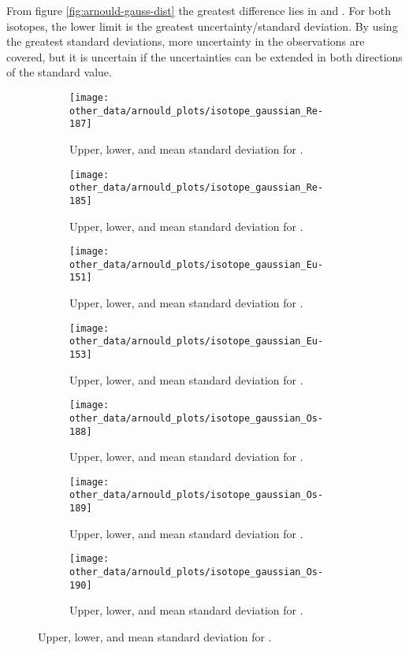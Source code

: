 From figure \ref{fig:arnould-gauss-dist} the greatest difference lies in  and . For both isotopes, the lower limit is the greatest uncertainty/standard deviation. By using the greatest standard deviations, more uncertainty in the observations are covered, but it is uncertain if the uncertainties can be extended in both directions of the standard value.
\newlength{\subfiglength}
\setlength{\subfiglength}{0.24\textwidth}

\begin{figure}
  \begin{subfigure}{\subfiglength}
    \centering
    \texttt{[image: other\_data/arnould\_plots/isotope\_gaussian\_Re-187]}
    \caption{Upper, lower, and mean standard deviation for .}
  \end{subfigure}
  \begin{subfigure}{\subfiglength}
    \centering
    \texttt{[image: other\_data/arnould\_plots/isotope\_gaussian\_Re-185]}
    \caption{Upper, lower, and mean standard deviation for .}
  \end{subfigure}
  \begin{subfigure}{\subfiglength}
    \centering
    \texttt{[image: other\_data/arnould\_plots/isotope\_gaussian\_Eu-151]}
    \caption{Upper, lower, and mean standard deviation for .}
  \end{subfigure}
  \begin{subfigure}{\subfiglength}
    \centering
    \texttt{[image: other\_data/arnould\_plots/isotope\_gaussian\_Eu-153]}
    \caption{Upper, lower, and mean standard deviation for .}
  \end{subfigure}
  \begin{subfigure}{\subfiglength}
    \centering
    \texttt{[image: other\_data/arnould\_plots/isotope\_gaussian\_Os-188]}
    \caption{Upper, lower, and mean standard deviation for .}
  \end{subfigure}
  \begin{subfigure}{\subfiglength}
    \centering
    \texttt{[image: other\_data/arnould\_plots/isotope\_gaussian\_Os-189]}
    \caption{Upper, lower, and mean standard deviation for .}
  \end{subfigure}
  \begin{subfigure}{\subfiglength}
    \centering
    \texttt{[image: other\_data/arnould\_plots/isotope\_gaussian\_Os-190]}
    \caption{Upper, lower, and mean standard deviation for .}

\end{subfigure}
\end{figure}
